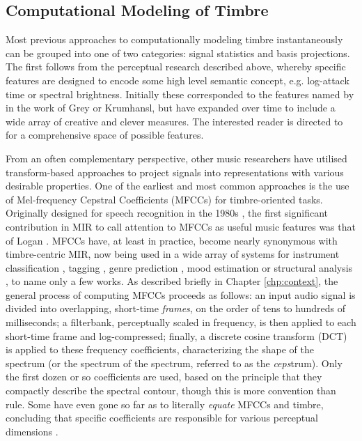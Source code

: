 \subsection{Computational Modeling of Timbre}
Most previous approaches to computationally modeling timbre instantaneously can be grouped into one of two categories: signal statistics and basis projections.
The first follows from the perceptual research described above, whereby specific features are designed to encode some high level semantic concept, e.g. log-attack time or spectral brightness.
Initially these corresponded to the features named by in the work of Grey or Krumhansl, but have expanded over time to include a wide array of creative and clever measures.
The interested reader is directed to \cite{Essid2006Musical} for a comprehensive space of possible features.

From an often complementary perspective, other music researchers have utilised transform-based approaches to project signals into representations with various desirable properties.
One of the earliest and most common approaches is the use of Mel-frequency Cepstral Coefficients (MFCCs) for timbre-oriented tasks.
Originally designed for speech recognition in the 1980s \cite{Mermelstein1980Comparison}, the first significant contribution in MIR to call attention to MFCCs as useful music features was that of Logan \cite{Logan2000Mel}.
MFCCs have, at least in practice, become nearly synonymous with timbre-centric MIR, now being used in a wide array of systems for instrument classification \cite{Herrera2003Automatic}, tagging \cite{Barrington2008Combining}, genre prediction \cite{Tzanetakis2002Musical}, mood estimation \cite{Schmidt2010Prediction} or structural analysis \cite{Paulus2010State}, to name only a few works.
As described briefly in Chapter \ref{chp:context}, the general process of computing MFCCs proceeds as follows:
an input audio signal is divided into overlapping, short-time \emph{frames}, on the order of tens to hundreds of milliseconds;
a filterbank, perceptually scaled in frequency, is then applied to each short-time frame and log-compressed;
finally, a discrete cosine transform (DCT) is applied to these frequency coefficients, characterizing the shape of the spectrum (or the spectrum of the spectrum, referred to as the \emph{ceps}trum).
Only the first dozen or so coefficients are used, based on the principle that they compactly describe the spectral contour, though this is more convention than rule.
Some have even gone so far as to literally \emph{equate} MFCCs and timbre, concluding that specific coefficients are responsible for various perceptual dimensions \cite{Terasawa2005Thirteen}.

